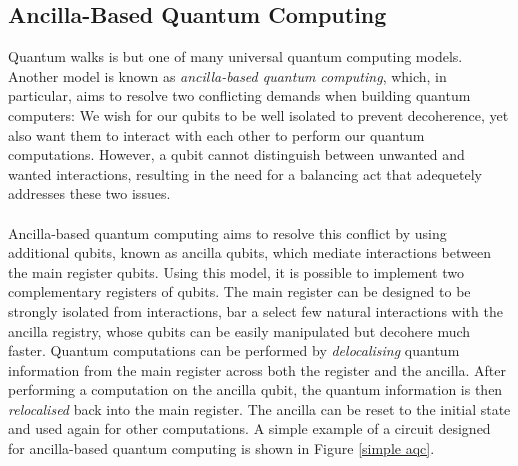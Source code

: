 \subsection{Ancilla-Based Quantum Computing}
Quantum walks is but one of many universal quantum computing models.
Another model is known as \emph{ancilla-based quantum computing}, which, in particular, aims to resolve two conflicting demands when building quantum computers:
We wish for our qubits to be well isolated to prevent decoherence, yet also want them to interact with each other to perform our quantum computations.
However, a qubit cannot distinguish between unwanted and wanted interactions, resulting in the need for a balancing act that adequetely addresses these two issues. \paragraph{}

Ancilla-based quantum computing aims to resolve this conflict by using additional qubits, known as ancilla qubits, which mediate interactions between the main register qubits. 
Using this model, it is possible to implement two complementary registers of qubits.
The main register can be designed to be strongly isolated from interactions, bar a select few natural interactions with the ancilla registry, whose qubits can be easily manipulated but decohere much faster. Quantum computations can be performed by \emph{delocalising} quantum information from the main register across both the register and the ancilla. After performing a computation on the ancilla qubit, the quantum information is then \emph{relocalised} back into the main register.
The ancilla can be reset to the initial state and used again for other computations.
A simple example of a circuit designed for ancilla-based quantum computing is shown in Figure \ref{simple aqc}. 

